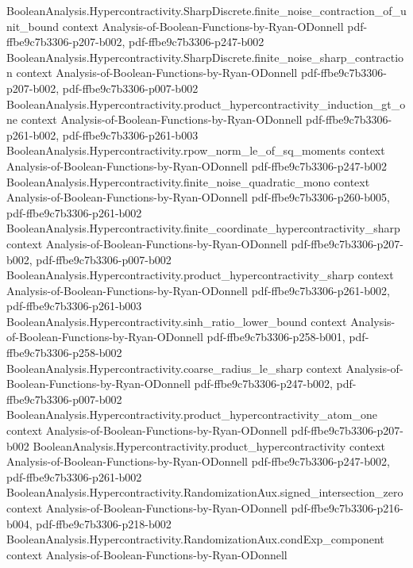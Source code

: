 \begin{theorem}
\proofstep
  {BooleanAnalysis.Hypercontractivity.SharpDiscrete.finite_noise_contraction_of_unit_bound}
  {context}
  {Analysis-of-Boolean-Functions-by-Ryan-ODonnell}
  {pdf-ffbe9c7b3306-p207-b002,
    pdf-ffbe9c7b3306-p247-b002}
\proofstep
  {BooleanAnalysis.Hypercontractivity.SharpDiscrete.finite_noise_sharp_contraction}
  {context}
  {Analysis-of-Boolean-Functions-by-Ryan-ODonnell}
  {pdf-ffbe9c7b3306-p207-b002,
    pdf-ffbe9c7b3306-p007-b002}
\proofstep
  {BooleanAnalysis.Hypercontractivity.product_hypercontractivity_induction_gt_one}
  {context}
  {Analysis-of-Boolean-Functions-by-Ryan-ODonnell}
  {pdf-ffbe9c7b3306-p261-b002,
    pdf-ffbe9c7b3306-p261-b003}
\proofstep
  {BooleanAnalysis.Hypercontractivity.rpow_norm_le_of_sq_moments}
  {context}
  {Analysis-of-Boolean-Functions-by-Ryan-ODonnell}
  {pdf-ffbe9c7b3306-p247-b002}
\proofstep
  {BooleanAnalysis.Hypercontractivity.finite_noise_quadratic_mono}
  {context}
  {Analysis-of-Boolean-Functions-by-Ryan-ODonnell}
  {pdf-ffbe9c7b3306-p260-b005,
    pdf-ffbe9c7b3306-p261-b002}
\proofstep
  {BooleanAnalysis.Hypercontractivity.finite_coordinate_hypercontractivity_sharp}
  {context}
  {Analysis-of-Boolean-Functions-by-Ryan-ODonnell}
  {pdf-ffbe9c7b3306-p207-b002,
    pdf-ffbe9c7b3306-p007-b002}
\proofstep
  {BooleanAnalysis.Hypercontractivity.product_hypercontractivity_sharp}
  {context}
  {Analysis-of-Boolean-Functions-by-Ryan-ODonnell}
  {pdf-ffbe9c7b3306-p261-b002,
    pdf-ffbe9c7b3306-p261-b003}
\proofstep
  {BooleanAnalysis.Hypercontractivity.sinh_ratio_lower_bound}
  {context}
  {Analysis-of-Boolean-Functions-by-Ryan-ODonnell}
  {pdf-ffbe9c7b3306-p258-b001,
    pdf-ffbe9c7b3306-p258-b002}
\proofstep
  {BooleanAnalysis.Hypercontractivity.coarse_radius_le_sharp}
  {context}
  {Analysis-of-Boolean-Functions-by-Ryan-ODonnell}
  {pdf-ffbe9c7b3306-p247-b002,
    pdf-ffbe9c7b3306-p007-b002}
\proofstep
  {BooleanAnalysis.Hypercontractivity.product_hypercontractivity_atom_one}
  {context}
  {Analysis-of-Boolean-Functions-by-Ryan-ODonnell}
  {pdf-ffbe9c7b3306-p207-b002}
\proofstep
  {BooleanAnalysis.Hypercontractivity.product_hypercontractivity}
  {context}
  {Analysis-of-Boolean-Functions-by-Ryan-ODonnell}
  {pdf-ffbe9c7b3306-p247-b002,
    pdf-ffbe9c7b3306-p261-b002}
\proofstep
  {BooleanAnalysis.Hypercontractivity.RandomizationAux.signed_intersection_zero}
  {context}
  {Analysis-of-Boolean-Functions-by-Ryan-ODonnell}
  {pdf-ffbe9c7b3306-p216-b004,
    pdf-ffbe9c7b3306-p218-b002}
\proofstep
  {BooleanAnalysis.Hypercontractivity.RandomizationAux.condExp_component}
  {context}
  {Analysis-of-Boolean-Functions-by-Ryan-ODonnell}

\end{theorem}
